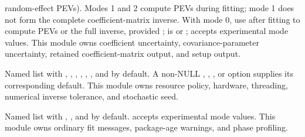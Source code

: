 \documentclass[a4paper]{book}
\begin{document}
\begin{Arguments}
\begin{ldescription}
random-effect PEVs). Modes 1 and 2 compute PEVs during fitting; mode 1
does not form the complete coefficient-matrix inverse. With mode 0, use
 after fitting to compute PEVs or the full inverse,
provided ;
 is  or ; 
accepts experimental mode values. This module owns coefficient uncertainty,
covariance-parameter uncertainty, retained coefficient-matrix output, and
setup output.
\item[\code{execution}] Named list with ,
, , ,
, , and  by
default. A non-NULL ,
, , or
 option supplies its corresponding default.
This module owns resource policy, hardware, threading, numerical inverse
tolerance, and stochastic seed.
\item[\code{diagnostics}] Named list with ,
, and  by default.
 accepts experimental mode values. This module owns ordinary
fit messages, package-age warnings, and phase profiling.
\end{ldescription}
\end{Arguments}
%
\end{document}
